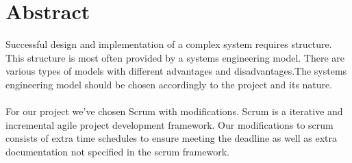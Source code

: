 \section{Abstract}

Successful design and implementation of a complex system requires structure. This structure is most often provided by a systems engineering model. There are various types of models with different advantages and disadvantages.The systems engineering model should be chosen accordingly to the project and its nature. \\\\
For our project we've chosen Scrum with modifications. Scrum is a iterative and incremental agile project development framework. Our modifications to scrum consists of extra time schedules to ensure meeting the deadline as well as extra documentation not specified in the scrum framework.





